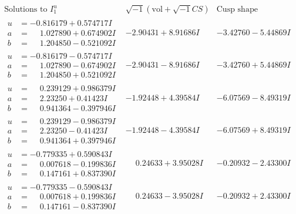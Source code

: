 \documentclass[1p]{elsarticle_modified}
\theoremstyle{definition}
\newcommand{\I}{\sqrt{-1}}
\begin{document}
$$\begin{array}{c|c|c}  
\text{Solutions to }I^u_{1}& \I (\text{vol} + \sqrt{-1}CS) & \text{Cusp shape}\\
 \hline 
\begin{aligned}
u &= -0.816179 + 0.574717 I \\
a &= \phantom{-}1.027890 + 0.674902 I \\
b &= \phantom{-}1.204850 - 0.521092 I\end{aligned}
 & -2.90431 + 8.91686 I & -3.42760 - 5.44869 I \\ \hline\begin{aligned}
u &= -0.816179 - 0.574717 I \\
a &= \phantom{-}1.027890 - 0.674902 I \\
b &= \phantom{-}1.204850 + 0.521092 I\end{aligned}
 & -2.90431 - 8.91686 I & -3.42760 + 5.44869 I \\ \hline\begin{aligned}
u &= \phantom{-}0.239129 + 0.986379 I \\
a &= \phantom{-}2.23250 + 0.41423 I \\
b &= \phantom{-}0.941364 - 0.397946 I\end{aligned}
 & -1.92448 + 4.39584 I & -6.07569 - 8.49319 I \\ \hline\begin{aligned}
u &= \phantom{-}0.239129 - 0.986379 I \\
a &= \phantom{-}2.23250 - 0.41423 I \\
b &= \phantom{-}0.941364 + 0.397946 I\end{aligned}
 & -1.92448 - 4.39584 I & -6.07569 + 8.49319 I \\ \hline\begin{aligned}
u &= -0.779335 + 0.590843 I \\
a &= \phantom{-}0.007618 - 0.199836 I \\
b &= \phantom{-}0.147161 + 0.837390 I\end{aligned}
 & \phantom{-}0.24633 + 3.95028 I & -0.20932 - 2.43300 I \\ \hline\begin{aligned}
u &= -0.779335 - 0.590843 I \\
a &= \phantom{-}0.007618 + 0.199836 I \\
b &= \phantom{-}0.147161 - 0.837390 I\end{aligned}
 & \phantom{-}0.24633 - 3.95028 I & -0.20932 + 2.43300 I \\ \hline\begin{aligned}

\end{aligned}
\end{array}$$
\end{document}
